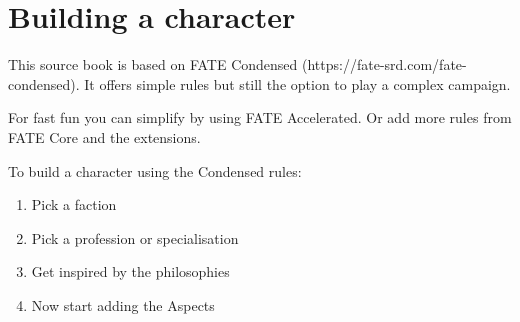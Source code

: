 \chapter{Building a character}

This source book is based on FATE Condensed (https://fate-srd.com/fate-condensed). It offers simple rules but still the option to play a complex campaign.

For fast fun you can simplify by using FATE Accelerated.
Or add more rules from FATE Core and the extensions.

To build a character using the Condensed rules:

\begin{enumerate}
    \item Pick a faction
    \item Pick a profession or specialisation
    \item Get inspired by the philosophies
    \item Now start adding the Aspects
\end{enumerate}
